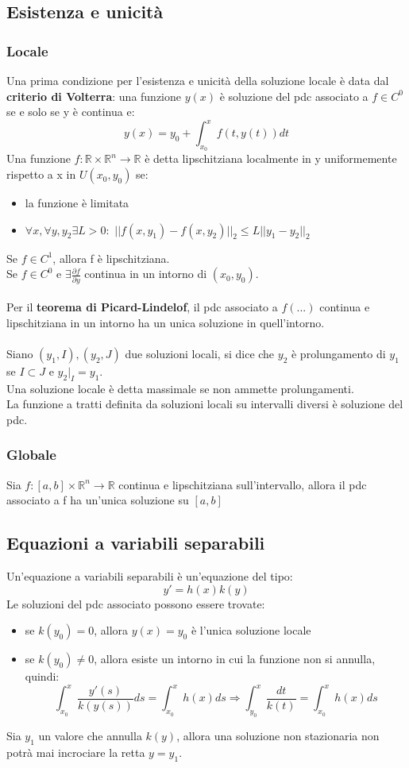 \documentclass{article}
\newcommand{\R}{\mathds{R}}
\begin{document}
\subsection{Esistenza e unicità}
\subsubsection{Locale}
Una prima condizione per l'esistenza e unicità della soluzione locale è data dal \textbf{criterio di Volterra}: una funzione $y(x)$ è soluzione del pdc associato a $f\in C^0$ se e solo se y è continua e:
$$ y(x)=y_0+\int_{x_0}^xf(t,y(t))dt $$
Una funzione $f:\R\times\R^n\rightarrow\R$ è detta lipschitziana localmente in y uniformemente rispetto a x in $U(x_0,y_0)$ se:
\begin{itemize}
    \item la funzione è limitata
    \item $\forall x,\forall y,y_2\exists L>0:$ $||f(x,y_1)-f(x,y_2)||_2\leq L||y_1-y_2||_2$
\end{itemize}
Se $f\in C^1$, allora f è lipschitziana.\\
Se $f\in C^0$ e $\exists\frac{\partial f}{\partial y}$ continua in un intorno di $(x_0,y_0)$.\\\\
Per il \textbf{teorema di Picard-Lindelof}, il pdc associato a $f(...)$ continua e lipschitziana in un intorno ha un unica soluzione in quell'intorno.\\\\
Siano $(y_1,I),(y_2,J)$ due soluzioni locali, si dice che $y_2$ è prolungamento di $y_1$ se $I\subset J$ e $y_2|_I=y_1$.\\
Una soluzione locale è detta massimale se non ammette prolungamenti.\\
La funzione a tratti definita da soluzioni locali su intervalli diversi è soluzione del pdc.

\subsubsection{Globale}
Sia $f:[a,b]\times\R^n\rightarrow\R$ continua e lipschitziana sull'intervallo, allora il pdc associato a f ha un'unica soluzione su $[a,b]$

\subsection{Equazioni a variabili separabili}
Un'equazione a variabili separabili è un'equazione del tipo:
$$ y'=h(x)k(y) $$
Le soluzioni del pdc associato possono essere trovate:
\begin{itemize}
    \item se $k(y_0)=0$, allora $y(x)=y_0$ è l'unica soluzione locale
    \item se $k(y_0)\neq 0$, allora esiste un intorno in cui la funzione non si annulla, quindi:
    $$ \int_{x_0}^x\frac{y'(s)}{k(y(s))}ds=\int_{x_0}^xh(x)ds\Rightarrow \int_{y_0}^x\frac{dt}{k(t)}=\int_{x_0}^xh(x)ds $$
\end{itemize}
Sia $y_1$ un valore che annulla $k(y)$, allora una soluzione non stazionaria non potrà mai incrociare la retta $y=y_1$.
\end{document}
